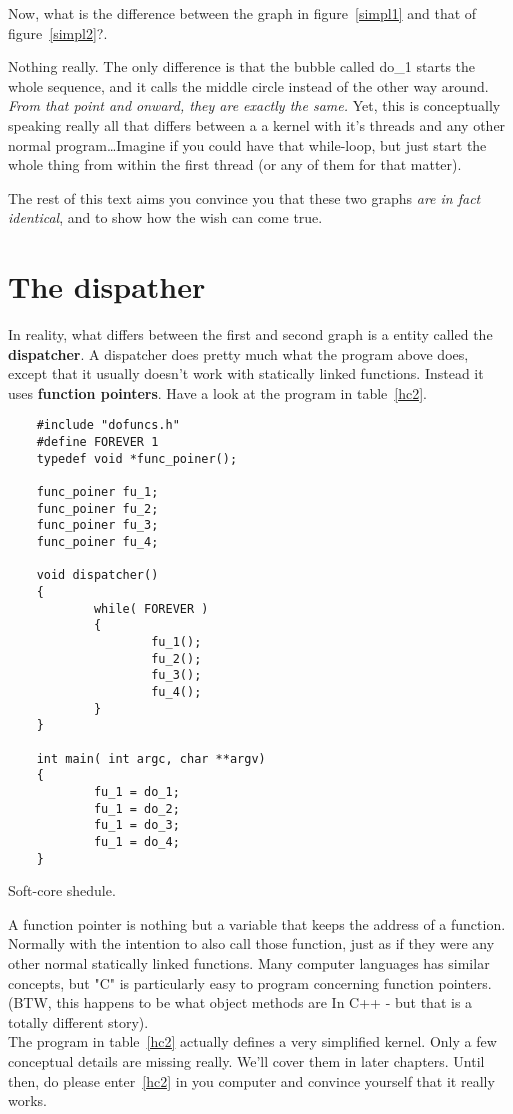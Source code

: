 	Now, what is the difference between the graph in figure~\ref{simpl1} and that of figure~\ref{simpl2}?.

	Nothing really. The only difference is that the bubble called do\_1 starts the whole sequence, and it calls the middle circle instead of the other way around. \textit{From that point and onward, they are exactly the same.} Yet, this is conceptually speaking really all that differs between a a kernel with it's threads and any other normal program\ldots Imagine if you could have that while-loop, but just start the whole thing from within the first thread (or any of them for that matter).

	The rest of this text aims you convince you that these two graphs \textit{are in fact identical}, and to show how the wish can come true.

\section{The dispather}
	In reality, what differs between the first and second graph is a entity called the \textbf{dispatcher}. A dispatcher does pretty much what the program above does, except that it usually doesn't work with statically linked functions. Instead it uses \textbf{function pointers}. Have a look at the program in table~\ref{hc2}.

	\begin{table}[!hbp]
	\begin{verbatim}
	#include "dofuncs.h"
	#define FOREVER 1
	typedef void *func_poiner();

	func_poiner fu_1;
	func_poiner fu_2;
	func_poiner fu_3;
	func_poiner fu_4;

	void dispatcher()
	{
	        while( FOREVER )
	        {
	                fu_1();
	                fu_2();
	                fu_3();
	                fu_4();
	        }
	}

	int main( int argc, char **argv)
	{
	        fu_1 = do_1;
	        fu_1 = do_2;
	        fu_1 = do_3;
	        fu_1 = do_4;
	}
	\end{verbatim}
	\caption{Soft-core shedule.\label{hc2}}
	\end{table}

	A function pointer is nothing but a variable that keeps the address of a function. Normally with the intention to also call those function, just as if they were any other normal statically linked functions. Many computer languages has similar concepts, but "C" is particularly easy to program concerning function pointers. (BTW, this happens to be what object methods are In C++ - but that is a totally different story).
\\
	The program in table~\ref{hc2} actually defines a very simplified kernel. Only a few conceptual details are missing really. We'll cover them in later chapters. Until then, do please enter~\ref{hc2} in you computer and convince yourself that it really works.

